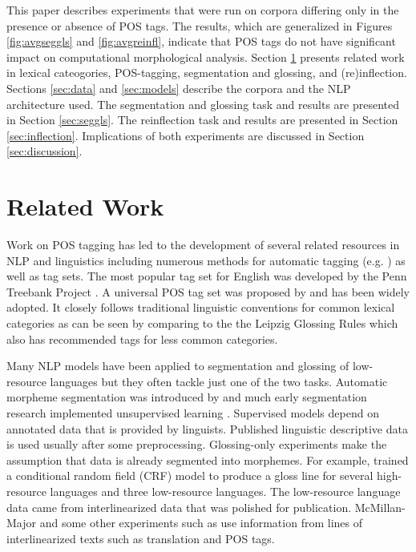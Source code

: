 This paper describes experiments that were run on corpora differing only in the presence or absence of POS tags. The results, which are generalized in Figures \ref{fig:avgseggls} and \ref{fig:avgreinfl}, indicate that POS tags do not have significant impact on computational morphological analysis. Section \ref{sec:related} presents related work in lexical cateogories, POS-tagging, segmentation and glossing, and (re)inflection. Sections \ref{sec:data} and \ref{sec:models} describe the corpora and the NLP architecture used. The segmentation and glossing task and results are presented in Section \ref{sec:seggls}. The reinflection task and results are presented in Section \ref{sec:inflection}. Implications of both experiments are discussed in Section \ref{sec:discussion}.


\section{Related Work}
\label{sec:related}

Work on POS tagging has led to the development of several related resources in NLP and linguistics including numerous methods for automatic tagging (e.g. \citet{kupiec_robust_1992,toutanova_bayesian_2008}) as well as tag sets. The most popular tag set for English was developed by the Penn Treebank Project \cite{taylor_penn_2003}. A universal POS tag set was proposed by \cite{petrov_universal_2012} and has been widely adopted. It closely follows traditional linguistic conventions for common lexical categories as can be seen by comparing to the the Leipzig Glossing Rules \citep{leipzig_2008} which also has recommended tags for less common categories.

Many NLP models have been applied to segmentation and glossing of low-resource languages but they often tackle just one of the two tasks. Automatic morpheme segmentation was introduced by \citet{harris_phoneme_1970} and much early segmentation research implemented unsupervised learning \cite{goldsmith_unsupervised_2001,creutz_unsupervised_2002,poon_unsupervised_2009}. Supervised models depend on annotated data that is provided by linguists. Published linguistic descriptive data is used usually after some preprocessing. 
Glossing-only experiments make the assumption that data is already segmented into morphemes. For example, \citet{mcmillan-major_automating_2020} trained a conditional random field (CRF) model to produce a gloss line for several high-resource languages and three low-resource languages. The low-resource language data came from interlinearized data that was polished for publication. McMillan-Major and some other experiments such as \citet{samardzic_automatic_2015} use information from lines of interlinearized texts such as translation and POS tags.

